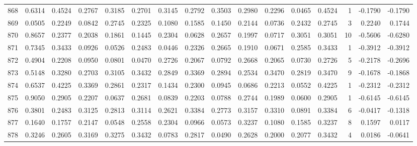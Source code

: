 \begin{tabular}{lrrrrrrrrrrrrrrr}
868 &      0.6314 &  0.4524 &  0.2767 &  0.3185 &  0.2701 &  0.3145 &  0.2792 &  0.3503 &  0.2980 &  0.2296 &   0.0465 &     0.4524 &      1 &                   -0.1790 &                    -0.1790 \\
869 &      0.0505 &  0.2249 &  0.0842 &  0.2745 &  0.2325 &  0.1080 &  0.1585 &  0.1450 &  0.2144 &  0.0736 &   0.2432 &     0.2745 &      3 &                    0.2240 &                     0.1744 \\
870 &      0.8657 &  0.2377 &  0.2038 &  0.1861 &  0.1445 &  0.2304 &  0.0628 &  0.2657 &  0.1997 &  0.0717 &   0.3051 &     0.3051 &     10 &                   -0.5606 &                    -0.6280 \\
871 &      0.7345 &  0.3433 &  0.0926 &  0.0526 &  0.2483 &  0.0446 &  0.2326 &  0.2665 &  0.1910 &  0.0671 &   0.2585 &     0.3433 &      1 &                   -0.3912 &                    -0.3912 \\
872 &      0.4904 &  0.2208 &  0.0950 &  0.0801 &  0.0470 &  0.2726 &  0.2067 &  0.0792 &  0.2668 &  0.2065 &   0.0730 &     0.2726 &      5 &                   -0.2178 &                    -0.2696 \\
873 &      0.5148 &  0.3280 &  0.2703 &  0.3105 &  0.3432 &  0.2849 &  0.3369 &  0.2894 &  0.2534 &  0.3470 &   0.2819 &     0.3470 &      9 &                   -0.1678 &                    -0.1868 \\
874 &      0.6537 &  0.4225 &  0.3369 &  0.2861 &  0.2317 &  0.1434 &  0.2300 &  0.0945 &  0.0686 &  0.2213 &   0.0552 &     0.4225 &      1 &                   -0.2312 &                    -0.2312 \\
875 &      0.9050 &  0.2905 &  0.2207 &  0.0637 &  0.2681 &  0.0839 &  0.2203 &  0.0788 &  0.2744 &  0.1989 &   0.0600 &     0.2905 &      1 &                   -0.6145 &                    -0.6145 \\
876 &      0.3801 &  0.2483 &  0.3125 &  0.2813 &  0.3114 &  0.2621 &  0.3384 &  0.2773 &  0.3157 &  0.3310 &   0.0891 &     0.3384 &      6 &                   -0.0417 &                    -0.1318 \\
877 &      0.1640 &  0.1757 &  0.2147 &  0.0548 &  0.2558 &  0.2304 &  0.0966 &  0.0573 &  0.3237 &  0.1080 &   0.1585 &     0.3237 &      8 &                    0.1597 &                     0.0117 \\
878 &      0.3246 &  0.2605 &  0.3169 &  0.3275 &  0.3432 &  0.0783 &  0.2817 &  0.0490 &  0.2628 &  0.2000 &   0.2077 &     0.3432 &      4 &                    0.0186 &                    -0.0641 \\

\end{tabular}
